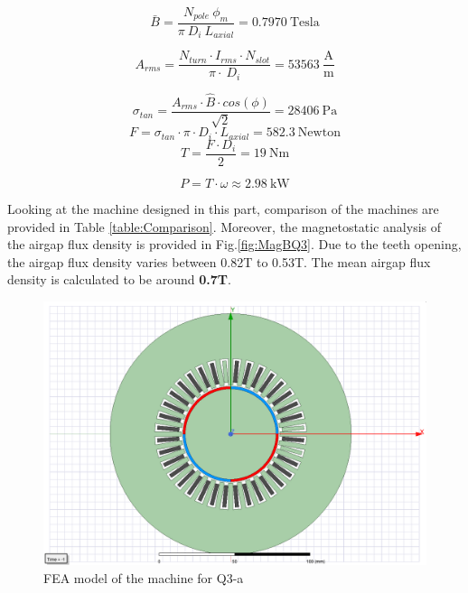 \documentclass{article}
\begin{document}
\begin{equation} \label{eqn:MagneticLoadingNew}
    \bar{B} = \frac{N_{pole}\:\phi_{m}}{\pi \: D_i \: L_{axial}} = 0.7970 \: \mathrm{Tesla}
\end{equation}

\begin{equation} \label{eqn:ElectricalLoadingNew}
    A_{rms} = \frac{N_{turn} \cdot I_{rms} \cdot N_{slot}}{\pi \cdot \: D_i} = 53563 \: \mathrm{\frac{\mathrm{A}}{\mathrm{m}}}
\end{equation}

\begin{equation} \label{eqn:AverageStressNew}
    \sigma_{tan} = \frac{A_{rms} \cdot \hat{B} \cdot cos(\phi)}{\sqrt{2}} = 28406 \: \mathrm{Pa}
\end{equation}
\begin{equation} \label{eqn:TotalForceNew}
    F = \sigma_{tan} \cdot \pi \cdot D_i \cdot L_{axial} = 582.3 \: \mathrm{Newton}
\end{equation}
\begin{equation} \label{eqn:TorqueNew}
    T = \frac{F \cdot D_i}{2} = 19 \: \mathrm{Nm}
\end{equation}

\begin{equation} \label{eqn:PowerNew}
    P = T \cdot \omega  \approx 2.98 \: \mathrm{kW}
\end{equation}

Looking at the machine designed in this part, comparison of the machines are provided in Table \ref{table:Comparison}. 
Moreover, the magnetostatic analysis of the airgap flux density is provided in Fig.\ref{fig:MagBQ3}. Due to the teeth opening, the airgap flux density varies between 0.82T to 0.53T. The mean airgap flux density is calculated to be around \textbf{0.7T}.
\begin{figure}[h!]
\centering
\includegraphics[scale=0.5]{Figures/MachineQ3.png}
\caption{FEA model of the machine for Q3-a}
\label{fig:MachineQ3}
\end{figure}
\end{document}
